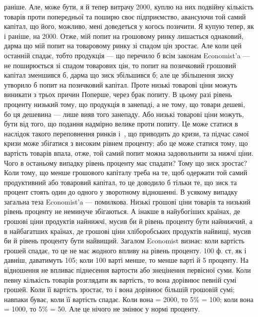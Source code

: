 \parcont{}  %
раніше. Але, може бути, я й тепер витрачу 2000, куплю на них подвійну
кількість товарів проти попередньої та поширю своє підприємство, авансуючи
той самий капітал, що його, можливо, мені доведеться у когось позичити. Я купую
тепер, як і раніше, на 2000. Отже, мій попит на грошовому ринку лишається
однаковий, дарма що мій попит на товаровому ринку зі спадом цін зростає.
Але коли цей останній спадає, тобто продукція — що перечило б всім законам
Economist'a — не поширюється зі спадом товарових цін, то попит на
позичковий грошовий капітал зменшився б, дарма що зиск збільшився б; але
це збільшення зиску утворило б попит на позичковий капітал. Проте низькі
товарові ціни можуть виникати з трьох причин Поперше, через брак попиту.
В цьому разі рівень проценту низький тому, що продукція в занепаді, а не
тому, що товари дешеві, бо ця дешевина — лише вияв того занепаду. Або
низькі товарові ціни можуть, бути від того, що подання надмірно велике проти
попиту. Це може статися в наслідок такого переповнення ринків і~,
що приводить до кризи, та підчас самої кризи може збігатися з високим рівнем
проценту; або це може статися тому, що вартість товарів впала, отже, той
самий попит можна задовольнити за нижчі ціни. Чого в останьому випадку рівень
проценту має спадати? Тому що зиск зростає? Коли тому, що менше грошового
капіталу треба на те, щоб одержати той самий продуктивний або товаровий
капітал, то це доводило б тільки те, що зиск та процент стоять один до одного
у зворотному відношенні. В усякому випадку загальна теза Economist’a — помилкова.
Низькі грошові ціни товарів та низький рівень проценту не неминуче збігаються.
А інакше в найубогіших країнах, де грошові ціни продуктів найнижчі,
мусив би й рівень проценту бути найнижчий, а в найбагатших країнах, де
грошові ціни хліборобських продуктів найвищі, мусив би й рівень проценту
бути найвищий. Загалом Economist визнає: коли вартість грошей спадає, то це
не має жодного впливу на рівень проценту. 100 ф. ст, як і давніш, даватимуть
105; коли 100 варті менше, то менше варті й 5 проценту.
На відношення не впливає піднесення вартости або знецінення первісної суми.
Коли певну кількість товарів розглядати як вартість, то вона дорівнює певній
сумі грошей. Коли її вартість зростає, то і вона дорівнює більшій грошовій
сумі; навпаки буває, коли її вартість спадає. Коли вона = 2000, то 5\% =
100; коли вона = 1000, то 5\% = 50. Але це нічого не змінює у нормі проценту.
